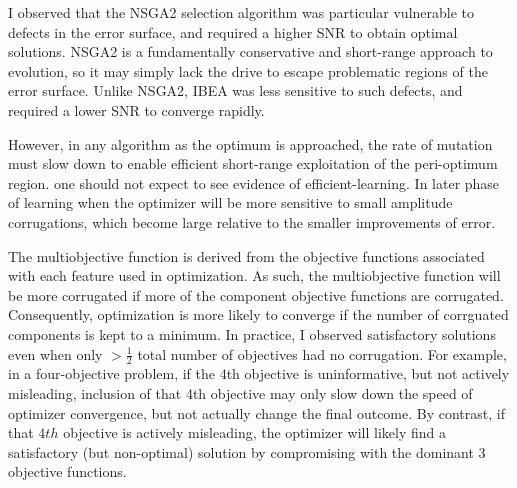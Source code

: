 I observed that the NSGA2 selection algorithm was particular vulnerable to defects in the error surface, and required a higher SNR to obtain optimal solutions.
NSGA2 is a fundamentally conservative and short-range approach to evolution, so it may simply lack the drive to escape problematic regions of the error surface.
Unlike NSGA2, IBEA was less sensitive to such defects, and required a lower SNR to converge rapidly. 

However, in any algorithm as the optimum is approached, the rate of mutation must slow down to enable efficient short-range exploitation of the peri-optimum region.
one should not expect to see evidence of efficient-learning. In later phase of learning when the optimizer will be more sensitive to small amplitude corrugations, which become large relative to the smaller improvements of error.

The multiobjective function is derived from the objective functions associated with each feature used in optimization.
As such, the multiobjective function will be more corrugated if more of the component objective functions are corrugated.
Consequently, optimization is more likely to converge if the number of corrguated components is kept to a minimum.
In practice, I observed satisfactory solutions even when only $>\frac{1}{2}$ total number of objectives had no corrugation.
For example, in a four-objective problem, if the $4$th objective is uninformative, but not actively misleading, inclusion of that 4th objective may only slow down the speed of optimizer convergence, but not actually change the final outcome.
By contrast, if that $4th$ objective is actively misleading, the optimizer will likely find a satisfactory (but non-optimal) solution by compromising with the dominant $3$ objective functions.

%      
%




